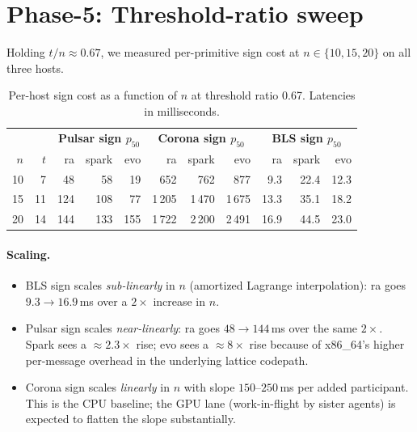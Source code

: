 \documentclass[11pt,a4paper]{article}
\begin{document}
\section{Phase-5: Threshold-ratio sweep}
\label{sec:phase5}

Holding $t/n \approx 0.67$, we measured per-primitive sign cost at
$n \in \{10, 15, 20\}$ on all three hosts.

\begin{table}[h]
\centering
\small
\begin{tabular}{@{}rrrrr|rrr|rrr@{}}
\toprule
\multicolumn{2}{c|}{} &
\multicolumn{3}{c|}{\textbf{Pulsar sign $p_{50}$}} &
\multicolumn{3}{c|}{\textbf{Corona sign $p_{50}$}} &
\multicolumn{3}{c}{\textbf{BLS sign $p_{50}$}} \\
$n$ & $t$ &
ra & spark & evo &
ra & spark & evo &
ra & spark & evo \\
\midrule
10 &  7 &  48 &  58 &  19 &   652 &   762 &   877 &  9.3 & 22.4 & 12.3 \\
15 & 11 & 124 & 108 &  77 & 1\,205 & 1\,470 & 1\,675 & 13.3 & 35.1 & 18.2 \\
20 & 14 & 144 & 133 & 155 & 1\,722 & 2\,200 & 2\,491 & 16.9 & 44.5 & 23.0 \\
\bottomrule
\end{tabular}
\caption{Per-host sign cost as a function of $n$ at threshold
ratio 0.67. Latencies in milliseconds.}
\label{tab:phase5}
\end{table}

\paragraph{Scaling.}
\begin{itemize}[leftmargin=2em,nosep]
\item BLS sign scales \emph{sub-linearly} in $n$ (amortized
  Lagrange interpolation): ra goes $9.3 \to 16.9$\,ms over a
  $2{\times}$ increase in $n$.
\item Pulsar sign scales \emph{near-linearly}: ra goes
  $48 \to 144$\,ms over the same $2{\times}$. Spark sees a
  $\approx 2.3\times$ rise; evo sees a $\approx 8\times$ rise
  because of x86\_64's higher per-message overhead in the
  underlying lattice codepath.
\item Corona sign scales \emph{linearly} in $n$ with slope
  $150$--$250$\,ms per added participant. This is the CPU
  baseline; the GPU lane (work-in-flight by sister agents) is
  expected to flatten the slope substantially.
\end{itemize}
\end{document}

